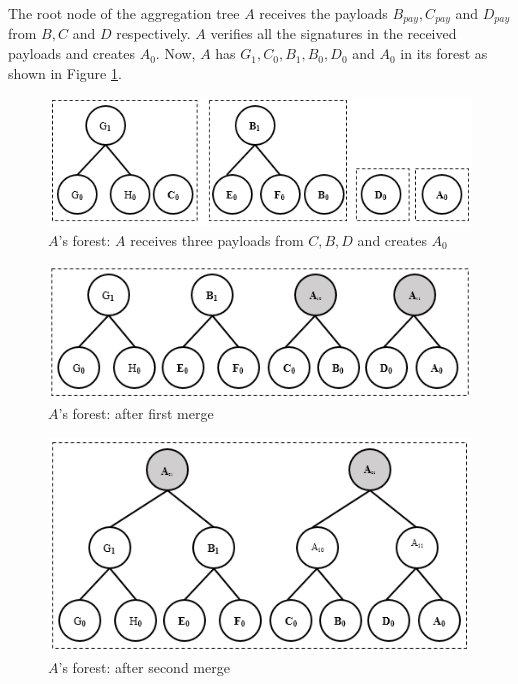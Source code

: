 		The root node of the aggregation tree $A$ receives the payloads $B_{pay}, C_{pay}$ and $D_{pay}$ from $B,C$ and $D$ respectively.
		$A$ verifies all the signatures in the received payloads and creates $A_{0}$.
		Now, $A$ has $G_{1},C_{0},B_{1},B_{0},D_{0}$ and $A_{0}$ in its forest as shown in Figure \ref{fig:a-forest}.
		\begin{figure}[h!]
			\centering
			\includegraphics{images/a-forest.png}
			\caption{$A$'s forest: $A$ receives three payloads from $C,B,D$ and creates $A_{0}$}
			\label{fig:a-forest}
		\end{figure}
		\begin{figure}[h!]
			\centering
			\includegraphics{images/a-forest-first-merge.png}
			\caption{$A$'s forest: after first merge}
			\label{fig:a-forest-first-merge}
		\end{figure}
		\begin{figure}[h!]
			\centering
			\includegraphics{images/a-forest-second-merge.png}
			\caption{$A$'s forest: after second merge}
			\label{fig:a-forest-second-merge}
		\end{figure}
